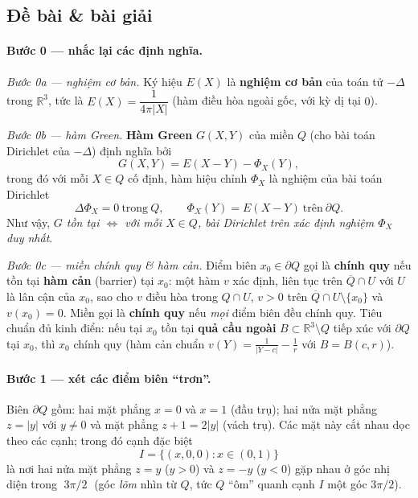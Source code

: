 \subsection*{Đề bài \& bài giải}
\paragraph{Bước 0 --- nhắc lại các định nghĩa.}\leavevmode

\emph{Bước 0a --- nghiệm cơ bản.} Ký hiệu $E(X)$ là \textbf{nghiệm cơ bản} của toán tử $-\Delta$ trong $\mathbb{R}^3$, tức là $E(X)=\dfrac{1}{4\pi|X|}$ (hàm điều hòa ngoài gốc, với kỳ dị tại $0$).

\emph{Bước 0b --- hàm Green.} \textbf{Hàm Green} $G(X,Y)$ của miền $Q$ (cho bài toán Dirichlet của $-\Delta$) định nghĩa bởi
\[
  G(X,Y)=E(X-Y)-\Phi_X(Y),
\]
trong đó với mỗi $X\in Q$ cố định, hàm hiệu chỉnh $\Phi_X$ là nghiệm của bài toán Dirichlet
\[
  \Delta\Phi_X=0\ \text{trong}\ Q,\qquad \Phi_X(Y)=E(X-Y)\ \text{trên}\ \partial Q.
\]
Như vậy, \emph{$G$ tồn tại $\iff$ với mỗi $X\in Q$, bài Dirichlet trên xác định nghiệm $\Phi_X$ duy nhất}.

\emph{Bước 0c --- miền chính quy \& hàm cản.} Điểm biên $x_0\in\partial Q$ gọi là \textbf{chính quy} nếu tồn tại \textbf{hàm cản} (barrier) tại $x_0$: một hàm $v$ xác định, liên tục trên $\overline{Q}\cap U$ với $U$ là lân cận của $x_0$, sao cho $v$ điều hòa trong $Q\cap U$, $v>0$ trên $\overline{Q}\cap U\setminus\{x_0\}$ và $v(x_0)=0$. Miền gọi là \textbf{chính quy} nếu \emph{mọi} điểm biên đều chính quy. Tiêu chuẩn đủ kinh điển: nếu tại $x_0$ tồn tại \textbf{quả cầu ngoài} $B\subset\mathbb{R}^3\setminus Q$ tiếp xúc với $\partial Q$ tại $x_0$, thì $x_0$ chính quy (hàm cản chuẩn $v(Y)=\tfrac{1}{|Y-c|}-\tfrac{1}{r}$ với $B=B(c,r)$).

\paragraph{Bước 1 --- xét các điểm biên ``trơn''.}\leavevmode

Biên $\partial Q$ gồm: hai mặt phẳng $x=0$ và $x=1$ (đầu trụ); hai nửa mặt phẳng $z=|y|$ với $y\ne0$ và mặt phẳng $z+1=2|y|$ (vách trụ). Các mặt này cắt nhau dọc theo các cạnh; trong đó cạnh đặc biệt
\[
  I=\{(x,0,0):x\in(0,1)\}
\]
là nơi hai nửa mặt phẳng $z=y$ ($y>0$) và $z=-y$ ($y<0$) gặp nhau ở góc nhị diện trong $\;3\pi/2\;$ (góc \emph{lõm} nhìn từ $Q$, tức $Q$ ``ôm'' quanh cạnh $I$ một góc $3\pi/2$).

